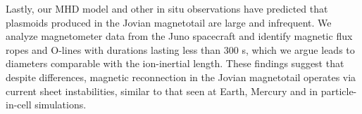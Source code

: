 Lastly, our MHD model and other in situ observations have predicted that plasmoids produced in the Jovian magnetotail are large and infrequent. We analyze magnetometer data from the Juno spacecraft and identify magnetic flux ropes and O-lines with durations lasting less than 300 s, which we argue leads to diameters comparable with the ion-inertial length. These findings suggest that despite differences, magnetic reconnection in the Jovian magnetotail operates via current sheet instabilities, similar to that seen at Earth, Mercury and in particle-in-cell simulations. 

